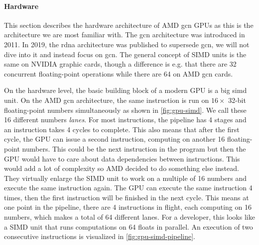 \paragraph{Hardware} This section describes the hardware architecture of AMD \gls{gcn} GPUs as this is the architecture we are most familiar with.
The \gls{gcn} architecture was introduced in 2011.
In 2019, the \gls{rdna} architecture was published to supersede \gls{gcn}, we will not dive into it and instead focus on \gls{gcn}.
The general concept of SIMD units is the same on NVIDIA graphic cards, though a difference is e.g. that there are 32 concurrent floating-point operations while there are 64 on AMD \gls{gcn} cards.

\begin{figure}
\centering
\begin{minipage}[t]{.5\textwidth}
	\centering
	
\end{minipage}%
\begin{minipage}[t]{.5\textwidth}
	\centering
	
\end{minipage}
\end{figure}
On the hardware level, the basic building block of a modern GPU is a big \gls{simd} unit.
On the AMD \gls{gcn} architecture, the same instruction is run on $16 \times$ 32-bit floating-point numbers simultaneously as shown in \cref{fig:gpu-simd}. We call these 16 different numbers \emph{lanes}.
For most instructions, the pipeline has 4 stages and an instruction takes 4 cycles to complete.
This also means that after the first cycle, the GPU can issue a second instruction, computing on another 16 floating-point numbers. This could be the next instruction in the program but then the GPU would have to care about data dependencies between instructions. This would add a lot of complexity so AMD decided to do something else instead. They virtually enlarge the SIMD unit to work on a multiple of 16 numbers and execute the same instruction again. The GPU can execute the same instruction 4 times, then the first instruction will be finished in the next cycle. This means at one point in the pipeline, there are 4 instructions in flight, each computing on 16 numbers, which makes a total of 64 different lanes. For a developer, this looks like a SIMD unit that runs computations on 64 floats in parallel. An execution of two consecutive instructions is visualized in \cref{fig:gpu-simd-pipeline}.

